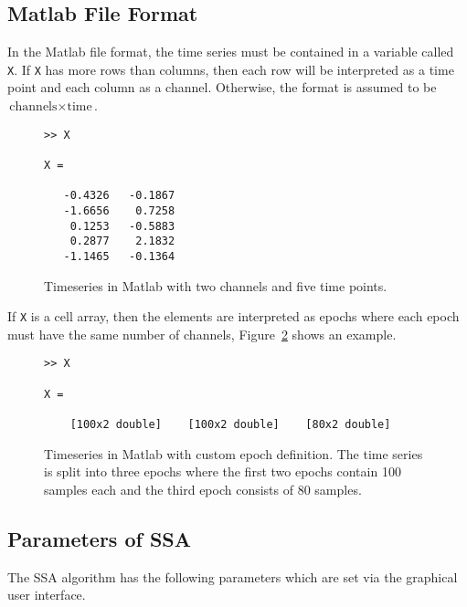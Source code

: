 \documentclass{article}
\newcommand{\1}{\ensuremath{\mathds{1}}}
\newcommand{\0}{\ensuremath{0}}
\begin{document}
\subsection{Matlab File Format}

In the Matlab file format, the time series must be contained in a variable
called \texttt{X}. If \texttt{X} has more rows than columns, then each row
will be interpreted as a time point and each column as a channel. Otherwise,
the format is assumed to be $\text{channels} \times \text{time}$. 

\begin{figure}[h]
\centering
\begin{boxedminipage}{10cm}
\begin{verbatim}
>> X

X =

   -0.4326   -0.1867
   -1.6656    0.7258
    0.1253   -0.5883
    0.2877    2.1832
   -1.1465   -0.1364

\end{verbatim}
\end{boxedminipage}
\caption{Timeseries in Matlab with two channels and five time points.
\label{fig:ex_matlabts}
}
\end{figure}

If \texttt{X} is a cell array, then the elements
are interpreted as epochs where each epoch must have the same number 
of channels, Figure~\ref{fig:ex_matlabsegs} shows
an example.

\begin{figure}[h]
\centering
\begin{boxedminipage}{10cm}
\begin{verbatim}
>> X

X = 

    [100x2 double]    [100x2 double]    [80x2 double]
\end{verbatim}
\end{boxedminipage}
\caption{Timeseries in Matlab with custom epoch definition. The time series is split
into three epochs where the first two epochs contain 100 samples each and the third
epoch consists of 80 samples.
\label{fig:ex_matlabsegs}
}
\end{figure}

\subsection{Parameters of SSA}
\label{sec:params}

The SSA algorithm has the following parameters which are set via the graphical user
interface.
\end{document}
